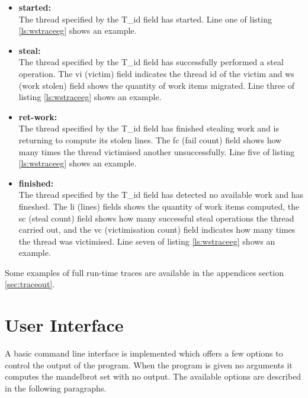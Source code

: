 \begin{itemize}
\item \textbf{started:} \\
        The thread specified by the T\_id field has started. Line one of listing \ref{ls:wstraceeg} shows an example.

\item \textbf{steal:} \\
        The thread specified by the T\_id field has successfully performed a steal
        operation. The vi (victim) field indicates the thread id of the victim and ws (work stolen) field shows
        the quantity of work items migrated. Line three of listing \ref{ls:wstraceeg} shows an example.

\item \textbf{ret-work:} \\
        The thread specified by the T\_id field has finished stealing work and is returning to compute its stolen 
        lines. The fc (fail count) field shows how many times the thread victimised another unsuccessfully. 
        Line five of listing \ref{ls:wstraceeg} shows an example.
        
\item \textbf{finished:} \\
        The thread specified by the T\_id field has detected no available work and has fineshed. The li (lines) fields shows the
        quantity of work items computed, the sc (steal count) field shows how many successful steal operations the thread carried out, 
        and the vc (victimisation count) field indicates how many times the thread was victimised.
        Line seven of listing \ref{ls:wstraceeg} shows an example.
        
\end{itemize}

Some examples of full run-time traces are available in the appendices section \ref{sec:traceout}.

\section{User Interface}
\label{sec:userint}

A basic command line interface is implemented which offers a few options to control the output of the program.
When the program is given no arguments it computes the mandelbrot set with no output.
The available options are described in the following paragraphs.

